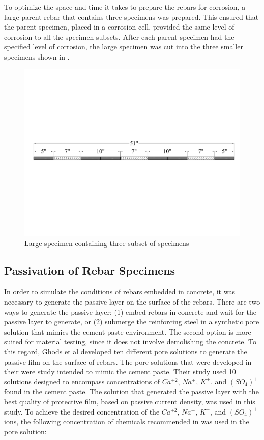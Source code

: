 To optimize the space and time it takes to prepare the rebars for corrosion, a large parent rebar that contains three specimens was prepared. This ensured that the parent specimen, placed in a corrosion cell, provided the same level of corrosion to all the specimen subsets. After each parent specimen had the specified level of corrosion, the large specimen was cut into the three smaller specimens shown in .

\begin{figure}[htbp]
	\centering
	\includegraphics[width=1.0\textwidth]{Chapter-3/figs/LargeSpecimen}
	\caption{Large specimen containing three subset of specimens}
	\label{fig:LargeSpecimen}
\end{figure}

\subsection{Passivation of Rebar Specimens}

In order to simulate the conditions of rebars embedded in concrete, it was necessary to generate the passive layer on the surface of the rebars. There are two ways to generate the passive layer: (1) embed rebars in concrete and wait for the passive layer to generate, or (2) submerge the reinforcing steel in a synthetic pore solution that mimics the cement paste environment. The second option is more suited for material testing, since it does not involve demolishing the concrete. To this regard, Ghods et al \cite{Ghods2010} developed ten different pore solutions to generate the passive film on the surface of rebars. The pore solutions that were developed in their were study intended to mimic the cement paste. Their study used 10 solutions designed to encompass concentrations of $Ca^{+2}$, $Na^{+}$, $K^{+}$, and $(SO_{4})^{+}$ found in the cement paste. The solution that generated the passive layer with the best quality of protective film, based on passive current density, was used in this study. To achieve the desired concentration of the $Ca^{+2}$, $Na^{+}$, $K^{+}$, and $(SO_{4})^{+}$ ions, the following concentration of chemicals recommended in \cite{Ghods2010} was used in the pore solution:

